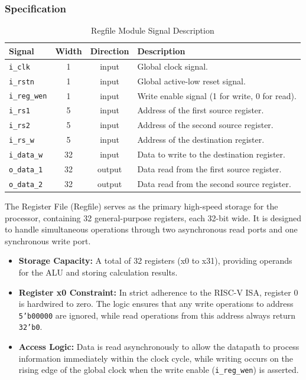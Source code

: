 \subsubsection{Specification}
\begin{table}[h]
	\centering
	\begin{tabular}{l c c p{8cm}}
		\toprule
		\textbf{Signal} & \textbf{Width} & \textbf{Direction} & \textbf{Description} \\ \midrule
		\texttt{i\_clk} & 1 & input & Global clock signal. \\ 
		\texttt{i\_rstn} & 1 & input & Global active-low reset signal. \\ 
		\texttt{i\_reg\_wen} & 1 & input & Write enable signal (1 for write, 0 for read). \\ 
		\texttt{i\_rs1} & 5 & input & Address of the first source register. \\ 
		\texttt{i\_rs2} & 5 & input & Address of the second source register. \\ 
		\texttt{i\_rs\_w} & 5 & input & Address of the destination register. \\ 
		\texttt{i\_data\_w} & 32 & input & Data to write to the destination register. \\ 
		\texttt{o\_data\_1} & 32 & output & Data read from the first source register. \\ 
		\texttt{o\_data\_2} & 32 & output & Data read from the second source register. \\ 
		\bottomrule
	\end{tabular}
	\caption{Regfile Module Signal Description}
	\label{tab:regfile_spec}
\end{table}


The Register File (Regfile) serves as the primary high-speed storage for the processor, containing 32 general-purpose registers, each 32-bit wide. It is designed to handle simultaneous operations through two asynchronous read ports and one synchronous write port.


\begin{itemize}
	\item \textbf{Storage Capacity:} A total of 32 registers (x0 to x31), providing operands for the ALU and storing calculation results.
	\item \textbf{Register x0 Constraint:} In strict adherence to the RISC-V ISA, register 0 is hardwired to zero. The logic ensures that any write operations to address \texttt{5'b00000} are ignored, while read operations from this address always return \texttt{32'b0}.
	\item \textbf{Access Logic:} Data is read asynchronously to allow the datapath to process information immediately within the clock cycle, while writing occurs on the rising edge of the global clock when the write enable (\texttt{i\_reg\_wen}) is asserted.
\end{itemize}
\newpage
